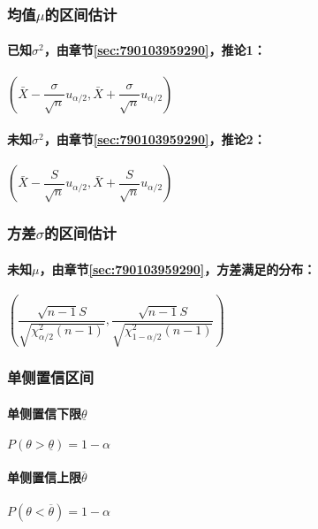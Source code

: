 \subsubsection{均值$\mu$的区间估计}


\paragraph{已知$\sigma^2$，由章节\ref{sec:790103959290}，推论1：}

$\left( \bar{X} - \dfrac{\sigma}{\sqrt{n}} u_{\alpha/2}, \bar{X} + \dfrac{\sigma}{\sqrt{n}} u_{\alpha/2} \right)$

\paragraph{未知$\sigma^2$，由章节\ref{sec:790103959290}，推论2：}

$\left( \bar{X} - \dfrac{S}{\sqrt{n}} u_{\alpha/2}, \bar{X} + \dfrac{S}{\sqrt{n}} u_{\alpha/2} \right)$

\subsubsection{方差$\sigma$的区间估计}

\paragraph{未知$\mu$，由章节\ref{sec:790103959290}，方差满足的分布：}

$\left( \dfrac{\sqrt{n-1}S}{\sqrt{\chi^{2}_{\alpha/2} (n-1)}},\dfrac{\sqrt{n-1}S}{\sqrt{\chi^{2}_{1-\alpha/2} (n-1)}} \right)$

\subsubsection{单侧置信区间}

\paragraph{单侧置信下限$\underline{\theta}$}

$P(\theta > \underline{\theta}) = 1 - \alpha$

\paragraph{单侧置信上限$\overline{\theta}$}

$P(\theta < \overline{\theta}) = 1 - \alpha$
